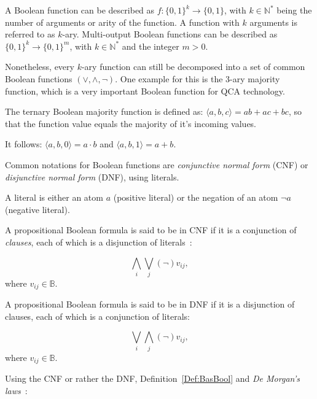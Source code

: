 \begin{definition}
	A Boolean function can be described as $f: \{0, 1\}^k \to \{0, 1\}$, with $k \in \mathbb{N}^*$ being the number of arguments or arity of the function. A function with $k$ arguments is referred to as $k$-ary. Multi-output Boolean functions can be described as $\{0, 1\}^k \to \{0, 1\}^m$, with $k \in \mathbb{N}^*$ and the integer $m > 0$.
\end{definition}

Nonetheless, every $k$-ary function can still be decomposed into a set of common Boolean functions $(\vee, \wedge, \neg )$. One example for this is the 3-ary majority function, which is a very important Boolean function for QCA technology.

\begin{definition}\label{Def:majf}
	The ternary Boolean majority function is defined as: $\langle a, b, c \rangle = ab + ac + bc$, so that the function value equals the majority of it's incoming values.
	
	It follows: $\langle a, b, 0 \rangle = a \cdot b$ and $\langle a, b, 1 \rangle = a + b$.
\end{definition}

Common notations for Boolean functions are \textit{conjunctive normal form} (CNF) or \textit{disjunctive normal form} (DNF), using literals.

\begin{definition}[Literal]
	A literal is either an atom $a$ (positive literal) or the negation of an atom $\neg a$ (negative literal).
\end{definition}

\begin{definition}
	A propositional Boolean formula is said to be in CNF if it is a conjunction of \textit{clauses}, each of which is a disjunction of literals~\cite{CNF}:
	
	\[\displaystyle\bigwedge_{i} \displaystyle\bigvee_{j} (\neg) v_{ij}, \]
	where $v_{ij} \in \mathbb{B}$.
	
	A propositional Boolean formula is said to be in DNF if it is a disjunction of clauses, each of which is a conjunction of literals:
	
	\[ \displaystyle\bigvee_{i} \displaystyle\bigwedge_{j} (\neg) v_{ij}, \]
	where $v_{ij} \in \mathbb{B}$.
	
\end{definition}

Using the CNF or rather the DNF, Definition~\ref{Def:BasBool} and \textit{De Morgan's laws}~\cite{DeMorgans_laws}:

